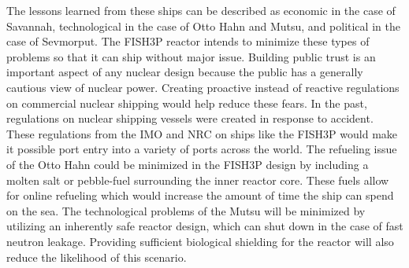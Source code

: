 \documentclass[12pt]{article}
\begin{document}
\begin{enumerate}
The lessons learned from these ships can be described as economic in the case of Savannah, technological in the case of Otto Hahn and Mutsu, and political in the case of Sevmorput.  The FISH3P reactor intends to minimize these types of problems so that it can ship without major issue.  Building public trust is an important aspect of any nuclear design because the public has a generally cautious view of nuclear power.  Creating proactive instead of reactive regulations on commercial nuclear shipping would help reduce these fears.  In the past, regulations on nuclear shipping vessels were created in response to accident.  These regulations from the IMO and NRC on ships like the FISH3P would make it possible port entry into a variety of ports across the world.  The refueling issue of the Otto Hahn could be minimized in the FISH3P design by including a molten salt or pebble-fuel surrounding the inner reactor core.  These fuels allow for online refueling which would increase the amount of time the ship can spend on the sea.  The technological problems of the Mutsu will be minimized by utilizing an inherently safe reactor design, which can shut down in the case of fast neutron leakage.  Providing sufficient biological shielding for the reactor will also reduce the likelihood of this scenario.

\end{enumerate}



\end{document}
